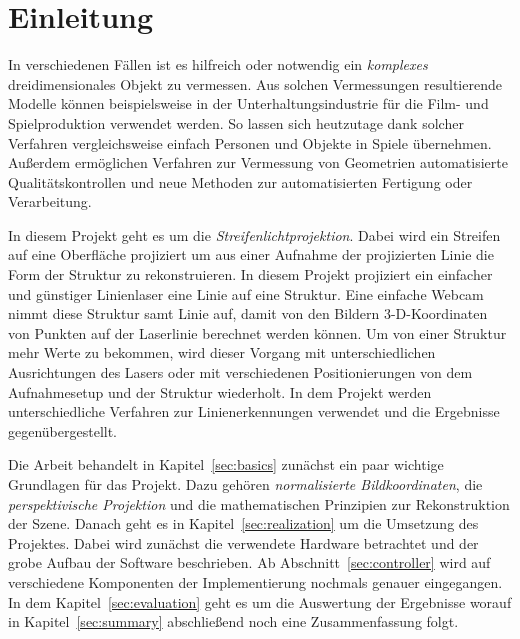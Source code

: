\documentclass[ngerman,a4paper,parskip=half]{scrartcl}
\begin{document}


\tableofcontents
\newpage


\section{Einleitung}
\label{sec:introduction}

In verschiedenen Fällen ist es hilfreich oder notwendig ein \emph{komplexes} dreidimensionales Objekt zu vermessen. Aus solchen Vermessungen resultierende Modelle können beispielsweise in der Unterhaltungsindustrie für die Film- und Spielproduktion verwendet werden. So lassen sich heutzutage dank solcher Verfahren vergleichsweise einfach Personen und Objekte in Spiele übernehmen. Außerdem ermöglichen Verfahren zur Vermessung von Geometrien automatisierte Qualitätskontrollen und neue Methoden zur automatisierten Fertigung oder Verarbeitung.

In diesem Projekt geht es um die \emph{Streifenlichtprojektion}. Dabei wird ein Streifen auf eine Oberfläche projiziert um aus einer Aufnahme der projizierten Linie die Form der Struktur zu rekonstruieren. In diesem Projekt projiziert ein einfacher und günstiger Linienlaser eine Linie auf eine Struktur. Eine einfache Webcam nimmt diese Struktur samt Linie auf, damit von den Bildern 3-D-Koordinaten von Punkten auf der Laserlinie berechnet werden können. Um von einer Struktur mehr Werte zu bekommen, wird dieser Vorgang mit unterschiedlichen Ausrichtungen des Lasers oder mit verschiedenen Positionierungen von dem Aufnahmesetup und der Struktur wiederholt. In dem Projekt werden unterschiedliche Verfahren zur Linienerkennungen verwendet und die Ergebnisse gegenübergestellt.

Die Arbeit behandelt in Kapitel~\ref{sec:basics} zunächst ein paar wichtige Grundlagen für das Projekt. Dazu gehören \emph{normalisierte Bildkoordinaten}, die \emph{perspektivische Projektion} und die mathematischen Prinzipien zur Rekonstruktion der Szene. Danach geht es in Kapitel~\ref{sec:realization} um die Umsetzung des Projektes. Dabei wird zunächst die verwendete Hardware betrachtet und der grobe Aufbau der Software beschrieben. Ab Abschnitt~\ref{sec:controller} wird auf verschiedene Komponenten der Implementierung nochmals genauer eingegangen. In dem Kapitel~\ref{sec:evaluation} geht es um die Auswertung der Ergebnisse worauf in Kapitel~\ref{sec:summary} abschließend noch eine Zusammenfassung folgt.
\end{document}
